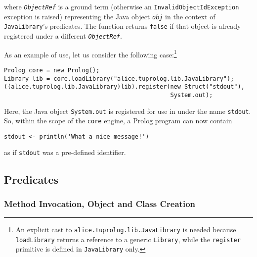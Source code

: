 \noindent where \texttt{\textit{ObjectRef}} is a ground term (otherwise an \texttt{InvalidObjectIdException} exception is raised) representing the Java object
\texttt{\textit{obj}} in the context of \texttt{JavaLibrary}'s predicates.
The function returns \texttt{false} if that object is already registered under a different \texttt{\textit{ObjectRef}}.

As an example of use, let us consider the following case:\footnote{An
  explicit cast to \texttt{alice.tuprolog.lib.JavaLibrary} is needed because
  \texttt{loadLibrary} returns a reference to a generic
  \texttt{Library}, while the \texttt{register} primitive is defined in
  \texttt{JavaLibrary} only.}
%
{\small
\begin{verbatim}
Prolog core = new Prolog();
Library lib = core.loadLibrary("alice.tuprolog.lib.JavaLibrary");
((alice.tuprolog.lib.JavaLibrary)lib).register(new Struct("stdout"),
                                               System.out);
\end{verbatim}}
%
\noindent Here, the Java object \texttt{System.out} is registered
for use in \tuprolog{} under the name \texttt{stdout}.
%
So, within the scope of the \texttt{core} engine, a Prolog program
can now contain
\begin{verbatim}
stdout <- println('What a nice message!')
\end{verbatim}
as if \texttt{stdout} was a pre-defined \tuprolog{} identifier.

\subsection{Predicates}
\label{ssec:all-javalibrary-predicates}

\subsubsection{Method Invocation, Object and Class Creation}

